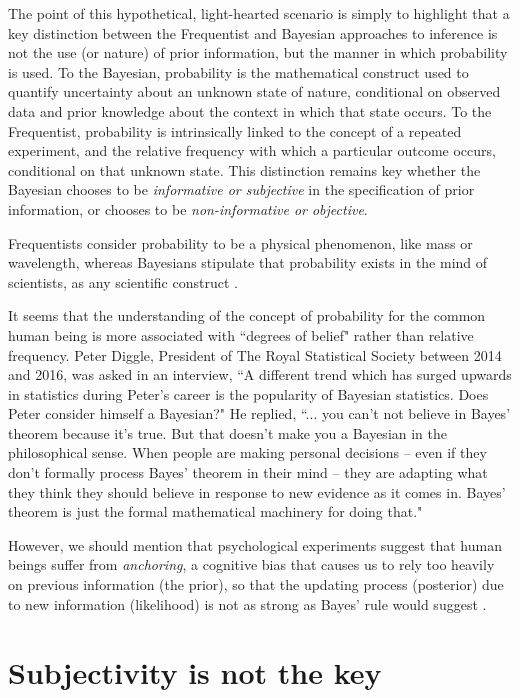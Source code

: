 The point of this hypothetical, light-hearted scenario is simply to highlight that a key distinction between the Frequentist and Bayesian approaches to inference is not the use (or nature) of prior information, but the manner in which probability is used. To the Bayesian, probability is the mathematical construct used to quantify uncertainty about an unknown state of nature, conditional on observed data and prior knowledge about the context in which that state occurs. To the Frequentist, probability is intrinsically linked to the concept of a repeated experiment, and the relative frequency with which a particular outcome occurs, conditional on that unknown state. This distinction remains key whether the Bayesian chooses to be \textit{informative or subjective} in the specification of prior information, or chooses to be \textit{non-informative or objective}.

Frequentists consider probability to be a physical phenomenon, like mass or wavelength, whereas Bayesians stipulate that probability exists in the mind of scientists, as any scientific construct \cite{Parmigiani2008}.

It seems that the understanding of the concept of probability for the common human being is more associated with ``degrees of belief" rather than relative frequency. Peter Diggle, President of The Royal Statistical Society between 2014 and 2016, was asked in an interview, ``A different trend which has surged upwards in statistics during Peter's career is the popularity of Bayesian statistics. Does Peter consider himself a Bayesian?" He replied, ``... you can't not believe in Bayes' theorem because it's true. But that doesn't make you a Bayesian in the philosophical sense. When people are making personal decisions -- even if they don't formally process Bayes' theorem in their mind -- they are adapting what they think they should believe in response to new evidence as it comes in. Bayes' theorem is just the formal mathematical machinery for doing that."

However, we should mention that psychological experiments suggest that human beings suffer from \textit{anchoring}, a cognitive bias that causes us to rely too heavily on previous information (the prior), so that the updating process (posterior) due to new information (likelihood) is not as strong as Bayes' rule would suggest \cite{daniel2017thinking}.


\section{Subjectivity is not the key}\label{sec22}

